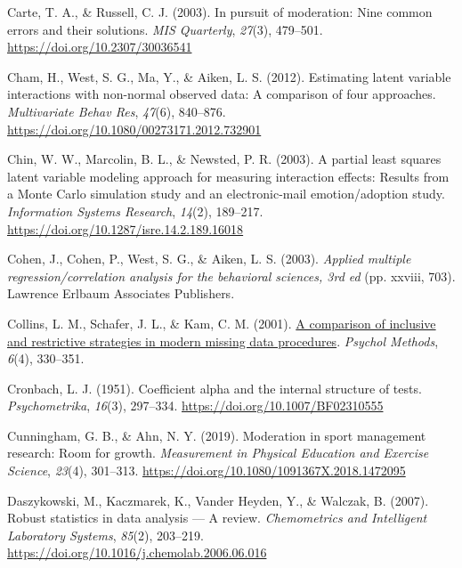\documentclass[
  man]{apa6}
\newlength{\cslhangindent}
\newenvironment{CSLReferences}[2] %
 {\begin{list}{}{%
  \setlength{\itemindent}{0pt}
  \setlength{\leftmargin}{0pt}
  \setlength{\parsep}{0pt}
  \ifodd #1
   \setlength{\leftmargin}{\cslhangindent}
   \setlength{\itemindent}{-1\cslhangindent}
  \fi
  \setlength{\itemsep}{#2\baselineskip}}}
 {\end{list}}
\begin{document}
\begin{CSLReferences}{1}{0}
Carte, T. A., \& Russell, C. J. (2003). In pursuit of moderation: {Nine} common errors and their solutions. \emph{MIS Quarterly}, \emph{27}(3), 479--501. \url{https://doi.org/10.2307/30036541}

Cham, H., West, S. G., Ma, Y., \& Aiken, L. S. (2012). Estimating latent variable interactions with non-normal observed data: {A} comparison of four approaches. \emph{Multivariate Behav Res}, \emph{47}(6), 840--876. \url{https://doi.org/10.1080/00273171.2012.732901}

Chin, W. W., Marcolin, B. L., \& Newsted, P. R. (2003). A partial least squares latent variable modeling approach for measuring interaction effects: {Results} from a {Monte Carlo} simulation study and an electronic-mail emotion/adoption study. \emph{Information Systems Research}, \emph{14}(2), 189--217. \url{https://doi.org/10.1287/isre.14.2.189.16018}

Cohen, J., Cohen, P., West, S. G., \& Aiken, L. S. (2003). \emph{Applied multiple regression/correlation analysis for the behavioral sciences, 3rd ed} (pp. xxviii, 703). Lawrence Erlbaum Associates Publishers.

Collins, L. M., Schafer, J. L., \& Kam, C. M. (2001). \href{https://www.ncbi.nlm.nih.gov/pubmed/11778676}{A comparison of inclusive and restrictive strategies in modern missing data procedures}. \emph{Psychol Methods}, \emph{6}(4), 330--351.

Cronbach, L. J. (1951). Coefficient alpha and the internal structure of tests. \emph{Psychometrika}, \emph{16}(3), 297--334. \url{https://doi.org/10.1007/BF02310555}

Cunningham, G. B., \& Ahn, N. Y. (2019). Moderation in sport management research: {Room} for growth. \emph{Measurement in Physical Education and Exercise Science}, \emph{23}(4), 301--313. \url{https://doi.org/10.1080/1091367X.2018.1472095}

Daszykowski, M., Kaczmarek, K., Vander Heyden, Y., \& Walczak, B. (2007). Robust statistics in data analysis --- {A} review. \emph{Chemometrics and Intelligent Laboratory Systems}, \emph{85}(2), 203--219. \url{https://doi.org/10.1016/j.chemolab.2006.06.016}


\end{CSLReferences}
\end{document}

